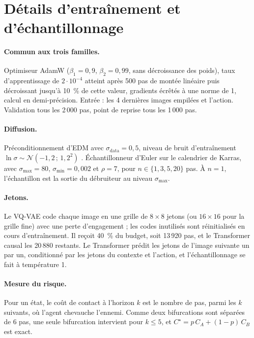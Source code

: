 \documentclass[a4paper, 11pt]{article}
\begin{document}
\section{Détails d'entraînement et d'échantillonnage}\label{app:details}

\paragraph{Commun aux trois familles.} Optimiseur AdamW ($\beta_1 = 0{,}9$, $\beta_2 = 0{,}99$, sans décroissance des poids),
taux d'apprentissage de $2\cdot10^{-4}$ atteint après 500 pas de montée linéaire puis décroissant jusqu'à 10~\% de cette
valeur, gradients écrêtés à une norme de 1, calcul en demi-précision. Entrée : les 4 dernières images empilées et l'action.
Validation tous les 2\,000 pas, point de reprise tous les 1\,000 pas.

\paragraph{Diffusion.} Préconditionnement d'EDM avec $\sigma_{\text{data}} = 0{,}5$, niveau de bruit d'entraînement
$\ln\sigma\sim\mathcal N(-1{,}2\,;\,1{,}2^2)$ \parencite{karras2022edm}. Échantillonneur d'Euler sur le calendrier de Karras,
avec $\sigma_{\max} = 80$, $\sigma_{\min} = 0{,}002$ et $\rho = 7$, pour $n \in \{1, 3, 5, 20\}$ pas. À $n = 1$, l'échantillon
est la sortie du débruiteur au niveau $\sigma_{\max}$.

\paragraph{Jetons.} Le VQ-VAE code chaque image en une grille de $8\times8$ jetons (ou $16\times16$ pour la grille fine) avec
une perte d'engagement \parencite{vandenoord2017vqvae} ; les codes inutilisés sont réinitialisés en cours d'entraînement. Il
reçoit 40~\% du budget, soit 13\,920 pas, et le Transformer causal les 20\,880 restants. Le Transformer prédit les jetons de
l'image suivante un par un, conditionné par les jetons du contexte et l'action, et l'échantillonnage se fait à température 1.

\paragraph{Mesure du risque.} Pour un état, le coût de contact à l'horizon $k$ est le nombre de pas, parmi les $k$ suivants, où
l'agent chevauche l'ennemi. Comme deux bifurcations sont séparées de 6 pas, une seule bifurcation intervient pour $k \le 5$, et
$C^\star = p\,C_A + (1-p)\,C_B$ est exact.
\end{document}
